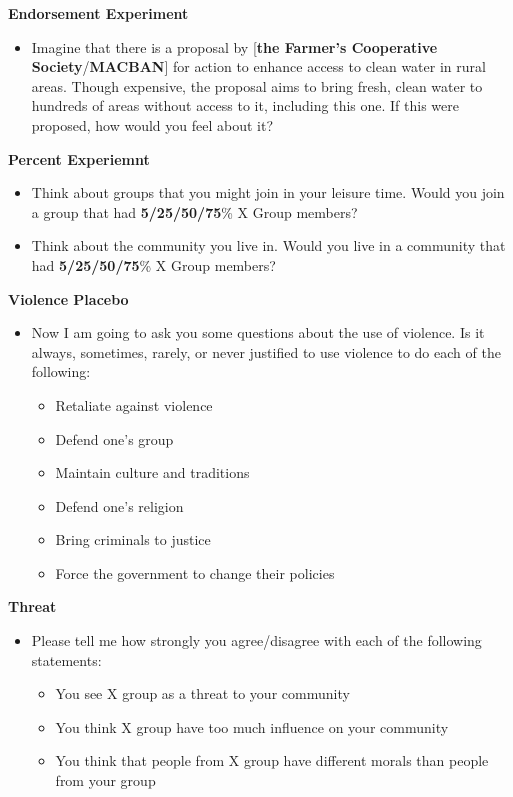 \documentclass[11pt]{article}
\providecommand{\tightlist}{%
  \setlength{\itemsep}{0pt}\setlength{\parskip}{0pt}}
\begin{document}
\textbf{Endorsement Experiment}

\begin{itemize}
\tightlist
\item
  Imagine that there is a proposal by {[}\textbf{the Farmer's
  Cooperative Society}/\textbf{MACBAN}{]} for action to enhance access
  to clean water in rural areas. Though expensive, the proposal aims to
  bring fresh, clean water to hundreds of areas without access to it,
  including this one. If this were proposed, how would you feel about
  it?
\end{itemize}

\textbf{Percent Experiemnt}

\begin{itemize}
\tightlist
\item
  Think about groups that you might join in your leisure time. Would you
  join a group that had \textbf{5/25/50/75}\% X Group members?
\item
  Think about the community you live in. Would you live in a community
  that had \textbf{5/25/50/75}\% X Group members?
\end{itemize}

\textbf{Violence Placebo}

\begin{itemize}
\tightlist
\item
  Now I am going to ask you some questions about the use of violence. Is
  it always, sometimes, rarely, or never justified to use violence to do
  each of the following:

  \begin{itemize}
  \tightlist
  \item
    Retaliate against violence
  \item
    Defend one's group
  \item
    Maintain culture and traditions
  \item
    Defend one's religion
  \item
    Bring criminals to justice
  \item
    Force the government to change their policies
  \end{itemize}
\end{itemize}

\textbf{Threat}

\begin{itemize}
\tightlist
\item
  Please tell me how strongly you agree/disagree with each of the
  following statements:

  \begin{itemize}
  \tightlist
  \item
    You see X group as a threat to your community
  \item
    You think X group have too much influence on your community
  \item
    You think that people from X group have different morals than people
    from your group
  \end{itemize}
\end{itemize}
\end{document}
